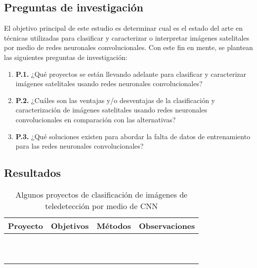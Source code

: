 \subsection{Preguntas de investigación}

El objetivo principal de este estudio es determinar cual es el estado del arte en técnicas utilizadas para clasificar y
caracterizar o interpretar imágenes satelitales por medio de redes neuronales convolucionales. Con este fin en mente,
se plantean las siguientes preguntas de investigación:

\begin{enumerate}
    \item[] {\bf P.1.} ¿Qué proyectos se están llevando adelante para clasificar y caracterizar imágenes satelitales
        usando redes neuronales convolucionales?
    \item[] {\bf P.2.} ¿Cuáles son las ventajas y/o desventajas de la clasificación y caracterización de imágenes
        satelitales usando redes neuronales convolucionales en comparación con las alternativas?
    \item[] {\bf P.3.} ¿Qué soluciones existen para abordar la falta de datos de entrenamiento para las redes
        neuronales convolucionales?
\end{enumerate}

\subsection{Resultados}

\begin{center}
    \begin{table}[h]
        \small
        \begin{tabular}{|c|c|c|c|}
            \hline
            \bf Proyecto & \bf Objetivos & \bf Métodos & \bf Observaciones \\
            \hline
            \autocite{langkvist-2016} & & & \\
            \hline
            \autocite{luengo-2016} & & & \\
            \hline
            \autocite{maggiori-2016-1} & & & \\
            \hline
            \autocite{sevo-2016} & & & \\
            \hline
            \autocite{zhong-2016} & & & \\
            \hline
            \autocite{sharma-2017} & & & \\
            \hline
            \autocite{pritt-2018} & & & \\
            \hline
            \autocite{rezaee-2018} & & & \\
            \hline
            \autocite{liu-2019} & & & \\
            \hline
            \autocite{amato-2023} & & & \\
            \hline
        \end{tabular}
        \caption{Algunos proyectos de clasificación de imágenes de teledetección por medio de CNN}
        \label{table:1}
    \end{table}
\end{center}

